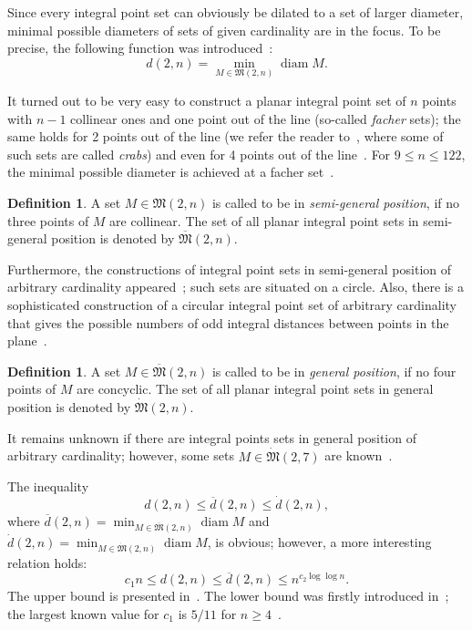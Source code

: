 \documentclass[a4paper,14pt]{article} %
\theoremstyle{plain}
\theoremstyle{definition}
\newtheorem{definition}[theorem]{Definition}
\begin{document}
Since every integral point set can obviously be dilated to a set of larger diameter,
minimal possible diameters of sets of given cardinality are in the focus.
To be precise,
the following function was introduced~\cite{kurz2008bounds,kurz2008minimum}:
\begin{equation}
	d(2,n) = \min_{M\in\mathfrak{M}(2,n)} \operatorname{diam} M
	.
\end{equation}

It turned out to be very easy to construct a planar integral point set of $n$ points with $n-1$ collinear ones and one point out of the line
(so-called \textit{facher} sets);
the same holds for 2 points out of the line (we refer the reader to~\cite{antonov2008maximal}, where some of such sets are called \textit{crabs})
and even for 4 points out of the line~\cite{huff1948diophantine}.
For $9\leq n\leq 122$, the minimal possible diameter is achieved at a facher set~\cite{kurz2008bounds}.


\begin{definition}
	A set $M\in\mathfrak{M}(2,n)$ is called to be in \textit{semi-general position},
	if no three points of $M$ are collinear.
	The set of all planar integral point sets in semi-general position
	is denoted by $\overline{\mathfrak{M}}(2,n)$.
\end{definition}

Furthermore, the constructions of integral point sets in semi-general position of arbitrary cardinality
appeared~\cite{harborth1993upper};
such sets are situated on a circle.
Also, there is a sophisticated construction of a circular integral point set of arbitrary cardinality
that gives the possible numbers of odd integral distances
between points in the plane~\cite{piepmeyer1996maximum}.


\begin{definition}
	A set $M\in\overline{\mathfrak{M}}(2,n)$ is called to be in \textit{general position},
	if no four points of $M$ are concyclic.
	The set of all planar integral point sets in general position
	is denoted by $\dot{\mathfrak{M}}(2,n)$.
\end{definition}

It remains unknown if there are integral points sets in general position of arbitrary cardinality;
however, some sets $M\in \dot{\mathfrak{M}}(2,7)$ are known~\cite{kreisel2008heptagon,kurz2013constructing}.

The inequality
\begin{equation*}
	d(2,n) \leq \overline{d}(2,n) \leq \dot{d}(2,n)
	,
\end{equation*}
where
$
	\overline{d}(2,n) = \min_{M\in\overline{\mathfrak{M}}(2,n)} \operatorname{diam} M
$
and
$
	\dot{d}(2,n) = \min_{M\in\dot{\mathfrak{M}}(2,n)} \operatorname{diam} M
$,
is obvious; however, a more interesting relation holds:
\begin{equation*}
	c_1 n \leq d(2,n) \leq \overline{d}(2,n) \leq n^{c_2 \log \log n}
	.
\end{equation*}
The upper bound is presented in~\cite{harborth1993upper}.
The lower bound was firstly introduced in~\cite{solymosi2003note};
the largest known value for $c_1$ is $5/11$ for $n\geq 4$~\cite{my-pps-linear-bound-2019}.
\end{document}
